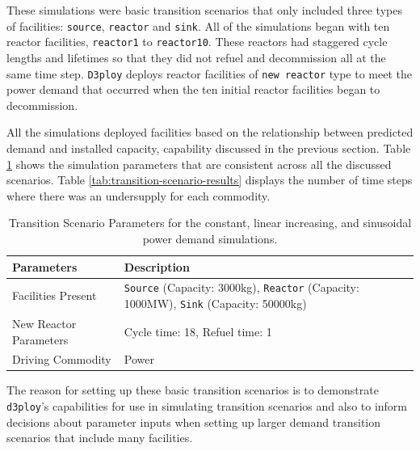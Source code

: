 \documentclass[11pt,letterpaper]{article}
\newcommand{\deploy}{\texttt{d3ploy}\xspace}%
\newcommand{\Deploy}{\texttt{D3ploy}\xspace}%
\begin{document}
These simulations were basic transition scenarios that only included 
three types of facilities: \texttt{source}, \texttt{reactor} and 
\texttt{sink}.
All of the simulations began with ten reactor facilities, 
\texttt{reactor1} to \texttt{reactor10}.
These reactors had staggered cycle lengths and lifetimes 
so that they did not refuel and decommission all at the same
time step.
\Deploy deploys reactor facilities of \texttt{new reactor} type
to meet the power demand that occurred when the ten initial 
reactor facilities began to decommission.

All the simulations deployed facilities based on the relationship
between predicted demand and installed capacity, capability 
discussed in the previous section.
Table \ref{tab:transition-scenario-all} shows the simulation 
parameters that are consistent across all the discussed 
scenarios. Table \ref{tab:transition-scenario-results} displays
the number of time steps where there was an undersupply for
each commodity.

\begin{table}[htb]
    \centering
    \caption {Transition Scenario Parameters for the constant, linear increasing, and sinusoidal power demand simulations.}
	\label{tab:transition-scenario-all}
    \begin{tabular}{|l|p{4.5cm}|}
    \hline
    \textbf{Parameters}    & \textbf{Description} \\ \hline
    Facilities Present     & \texttt{Source} (Capacity: 3000kg), \texttt{Reactor} (Capacity: 1000MW), \texttt{Sink} (Capacity: 50000kg)      \\ \hline
    New Reactor Parameters & Cycle time: 18, Refuel time: 1\\ \hline
    Driving Commodity & Power \\ \hline
    \end{tabular}
\end{table}

The reason for setting up these basic transition scenarios is to 
demonstrate \deploy's capabilities for use in simulating 
transition scenarios and 
also to inform decisions about parameter inputs when setting up larger 
demand transition scenarios that include many facilities. 
\end{document}
